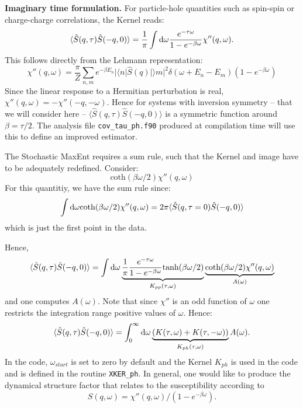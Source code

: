 \noindent
\textbf{Imaginary time formulation.}
 For particle-hole quantities such as spin-spin or charge-charge correlations, 
the  Kernel reads:
\begin{equation}
	\langle \hat{S}(q,\tau) \hat{S}(-q,0) \rangle  = \frac{1}{\pi} 
   \int {\text d} \omega  \frac{e^{- \tau \omega} }{ 1 - e^{-\beta  \omega} } \chi''(q,\omega).
\end{equation}
This follows directly from the  Lehmann representation: 
\begin{equation}
 \chi''(q,\omega)  = \frac{\pi}{Z} \sum_{n,m} e^{-\beta E_n} |\langle n | \hat{S}(q) | \rangle m |^2 
\delta ( \omega + E_n - E_m) \left( 1 - e^{-\beta  \omega} \right) 
\end{equation}
Since the linear response to a Hermitian perturbation  is real, $\chi''(q,\omega)  = - \chi''(-q,-\omega)$.  Hence for systems with inversion symmetry -- that 
we will consider here -- $\langle \hat{S}(q,\tau) \hat{S}(-q,0) \rangle $ is a symmetric function around $\beta= \tau/2$.  The analysis  file \texttt{cov\_tau\_ph.f90} produced at compilation
time will use this  to define an improved estimator. 

The  Stochastic MaxEnt requires a sum rule, such that   the Kernel and image have to be adequately redefined. 
Consider: 
\begin{equation}
	\text{coth}(\beta \omega/2) \chi''(q,\omega)
\end{equation}
For this quantitiy, we have the sum rule since: 
\begin{equation}
	\int {\text d} \omega 	\text{coth}(\beta \omega/2) \chi''(q,\omega) = 
  2 \pi \langle \hat{S}(q,\tau=0) \hat{S}(-q,0) \rangle
\end{equation}
which is just the first point in the data. 

Hence,
\begin{equation}
	\langle \hat{S}(q,\tau) \hat{S}(-q,0) \rangle  =  
       \int {\text d} \omega  \underbrace{ \frac{1}{\pi} \frac{e^{- \tau \omega} }
            { 1 - e^{-\beta  \omega} } \text{tanh}(\beta \omega/2)  }_{K_{pp}(\tau,\omega)} 
       \underbrace{ \text{coth}(\beta \omega/2)   \chi''(q,\omega) }_{A(\omega)} 
\label{Kpp.eq}
\end{equation}
and one  computes $A(\omega)$. Note that since $\chi'' $ is an odd function of $\omega$  one restricts the integration range  positive values of $\omega$. 
Hence: 
\begin{equation}
	\langle \hat{S}(q,\tau) \hat{S}(-q,0) \rangle  =  
       \int_{0}^{\infty}  {\text d} \omega \underbrace{\left( K(\tau,\omega)  + K(\tau,-\omega) \right)}_{K_{ph}(\tau,\omega)}  A(\omega).
\end{equation}
In the code, $\omega_{start}$ is set to zero by default and the Kernel $K_{ph}$ is used in the code and is defined in the  routine \texttt{XKER\_ph}. 
In general,  one would like to produce the  dynamical structure factor that relates to the susceptibility according to
\begin{equation}
 S(q,\omega)  = \chi''(q,\omega)/\left( 1 - e^{-\beta  \omega} \right). 
\end{equation}

